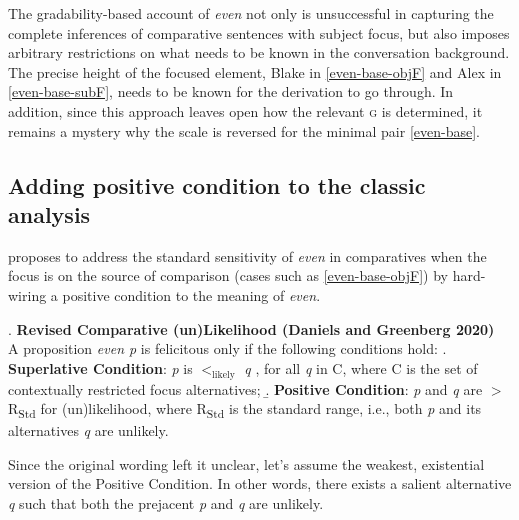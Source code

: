 \documentclass[12pt,letterpaper]{scrartcl}
\begin{document}
The gradability-based account of \textit{even} not only is unsuccessful in capturing the complete inferences of comparative sentences with subject focus, but also imposes arbitrary restrictions on what needs to be known in the conversation background. The precise height of the focused element, Blake in \ref{even-base-objF} and Alex in \ref{even-base-subF}, needs to be known for the derivation to go through. In addition, since this approach leaves open how the relevant \textsc{g} is determined, it remains a mystery why the scale is reversed for the minimal pair \ref{even-base}.




\subsection{Adding positive condition to the classic analysis}

\cite{daniels_even_2020} proposes to address the standard sensitivity of \textit{even} in comparatives when the focus is on the source of comparison (cases such as \ref{even-base-objF}) by hard-wiring a positive condition to the meaning of \textit{even}.

\ex.\label{DG_Unlikelihood} \textbf{Revised Comparative (un)Likelihood (Daniels and Greenberg 2020)} \\
A proposition \textit{even p} is felicitous only if the following conditions hold:
\a. \textbf{Superlative Condition}: \textit{p} is $<_{\text{likely}}$ \textit{q }, for all \textit{q} in C, where C is the set of contextually restricted focus alternatives;
\b. \textbf{Positive Condition}: \textit{p} and \textit{q } are $>$ R\textsubscript{Std} for (un)likelihood, where R\textsubscript{Std} is the standard range, i.e., both \textit{p} and its alternatives \textit{q} are unlikely.

Since the original wording left it unclear, let's assume the weakest, existential version of the Positive Condition. In other words, there exists a salient alternative \textit{q} such that both the prejacent \textit{p} and \textit{q} are unlikely. 
\end{document}
